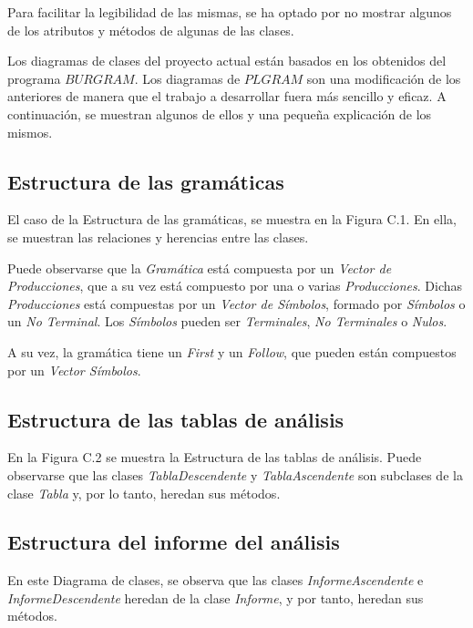 Para facilitar la legibilidad de las mismas, se ha optado por no mostrar algunos de los atributos y métodos de algunas de las clases.

Los diagramas de clases del proyecto actual están basados en los obtenidos del programa $BURGRAM$. Los diagramas de $PLGRAM$ son una modificación de los anteriores de manera que el trabajo a desarrollar fuera más sencillo y eficaz. A continuación, se muestran algunos de ellos y una pequeña explicación de los mismos.
\newpage
\subsection{Estructura de las gramáticas}
El caso de la Estructura de las gramáticas, se muestra en la Figura C.1. En ella, se muestran las relaciones y herencias entre las clases.

Puede observarse que la \textit{Gramática} está compuesta por un \textit{Vector de Producciones}, que a su vez está compuesto por una o varias \textit{Producciones}. Dichas \textit{Producciones} está compuestas por un \textit{Vector de Símbolos}, formado por \textit{Símbolos} o un \textit{No Terminal}. Los \textit{Símbolos} pueden ser \textit{Terminales}, \textit{No Terminales} o \textit{Nulos}.

A su vez, la gramática tiene un \textit{First} y un \textit{Follow}, que pueden están compuestos por un \textit{Vector Símbolos}.

\newpage
\subsection{Estructura de las tablas de análisis}

En la Figura C.2 se muestra la Estructura de las tablas de análisis. Puede observarse que las clases \textit{TablaDescendente} y \textit{TablaAscendente} son subclases de la clase \textit{Tabla} y, por lo tanto, heredan sus métodos.
\vspace{0.5cm}
\newpage
\subsection{Estructura del informe del análisis}

En este Diagrama de clases, se observa que las clases \textit{InformeAscendente} e \textit{InformeDescendente} heredan de la clase \textit{Informe}, y por tanto, heredan sus métodos.

